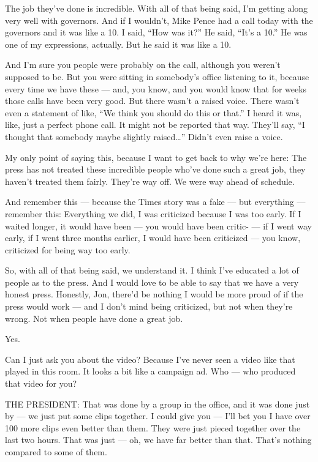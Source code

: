 The job they've done is incredible. With all of that being said, I'm
getting along very well with governors. And if I wouldn't, Mike Pence
had a call today with the governors and it was like a 10. I said, ``How
was it?'' He said, ``It's a 10.'' He was one of my expressions,
actually. But he said it was like a 10.

And I'm sure you people were probably on the call, although you weren't
supposed to be. But you were sitting in somebody's office listening to
it, because every time we have these --- and, you know, and you would
know that for weeks those calls have been very good. But there wasn't a
raised voice. There wasn't even a statement of like, ``We think you
should do this or that.'' I heard it was, like, just a perfect phone
call. It might not be reported that way. They'll say, ``I thought that
somebody maybe slightly raised\ldots{}'' Didn't even raise a voice.

My only point of saying this, because I want to get back to why we're
here: The press has not treated these incredible people who've done such
a great job, they haven't treated them fairly. They're way off. We were
way ahead of schedule.

And remember this --- because the Times story was a fake --- but
everything --- remember this: Everything we did, I was criticized
because I was too early. If I waited longer, it would have been --- you
would have been critic- --- if I went way early, if I went three months
earlier, I would have been criticized --- you know, criticized for being
way too early.

So, with all of that being said, we understand it. I think I've educated
a lot of people as to the press. And I would love to be able to say that
we have a very honest press. Honestly, Jon, there'd be nothing I would
be more proud of if the press would work --- and I don't mind being
criticized, but not when they're wrong. Not when people have done a
great job.

Yes.

Can I just ask you about the video? Because I've never seen a video like
that played in this room. It looks a bit like a campaign ad. Who --- who
produced that video for you?

THE PRESIDENT: That was done by a group in the office, and it was done
just by --- we just put some clips together. I could give you --- I'll
bet you I have over 100 more clips even better than them. They were just
pieced together over the last two hours. That was just --- oh, we have
far better than that. That's nothing compared to some of them.

